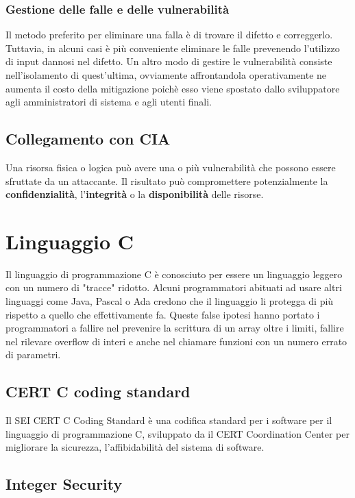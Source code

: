 \subsection{Gestione delle falle e delle vulnerabilità}
Il metodo preferito per eliminare una falla è di trovare il difetto e correggerlo. Tuttavia, in alcuni casi è più conveniente eliminare le falle prevenendo l'utilizzo di input dannosi nel difetto. Un altro modo di gestire le vulnerabilità consiste nell'isolamento di quest'ultima, ovviamente affrontandola operativamente ne aumenta il costo della mitigazione poichè esso viene spostato dallo sviluppatore agli amministratori di sistema e agli utenti finali.

\section{Collegamento con CIA}
Una risorsa fisica o logica può avere una o più vulnerabilità che possono essere sfruttate da un attaccante. Il risultato può compromettere potenzialmente la \textbf{confidenzialità}, l'\textbf{integrità} o la \textbf{disponibilità} delle risorse.

\chapter{Linguaggio C}
Il linguaggio di programmazione C è conosciuto per essere un linguaggio leggero con un numero di "tracce" ridotto.
Alcuni programmatori abituati ad usare altri linguaggi come Java, Pascal o Ada credono che il linguaggio li protegga di più rispetto a quello che effettivamente fa. Queste false ipotesi hanno portato i programmatori a fallire nel prevenire la scrittura di un array oltre i limiti, fallire nel rilevare overflow di interi e anche nel chiamare funzioni con un numero errato di parametri.

\section{CERT C coding standard}
Il SEI CERT C Coding Standard è una codifica standard per i software per il linguaggio di programmazione C, sviluppato da il CERT Coordination Center per migliorare la sicurezza, l'affibidabilità del sistema di software.

\section{Integer Security}

